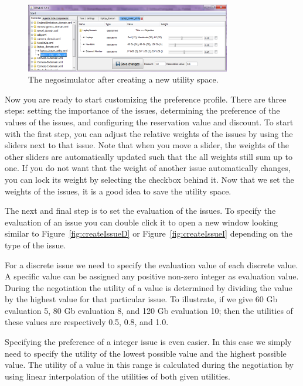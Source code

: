 \documentclass[]{article}
\begin{document}
\begin{figure}[htb]
	\centering
	\includegraphics[width=0.8\textwidth]{media/image8.png}
\caption{The negosimulator after creating a new utility space.}\label{fig:utilcreated}
\end{figure}

Now you are ready to start customizing the preference profile. There are three steps: setting the importance of the issues, determining the preference of the values of the issues, and configuring the reservation value and discount. To start with the first step, you can adjust the relative weights of the issues by using the sliders next to that issue. Note that when you move a slider, the weights of the other sliders are automatically updated such that the all weights still sum up to one. If you do not want that the weight of another issue automatically changes, you can lock its weight by selecting the checkbox behind it. Now that we set the weights of the issues, it is a good idea to save the utility space.

The next and final step is to set the evaluation of the issues. To specify the evaluation of an issue you can double click it to open a new window looking similar to Figure~\ref{fig:createIssueD} or Figure~\ref{fig:createIssueI} depending on the type of the issue.

For a discrete issue we need to specify the evaluation value of each discrete value. A specific value can be assigned any positive non-zero integer as evaluation value. During the negotiation the utility of a value is determined by dividing the value by the highest value for that particular issue. To illustrate, if we give 60 Gb evaluation 5, 80 Gb evaluation 8, and 120 Gb evaluation 10; then the utilities of these values are respectively 0.5, 0.8, and 1.0.

Specifying the preference of a integer issue is even easier. In this case we simply need to specify the utility of the lowest possible value and the highest possible value. The utility of a value in this range is calculated during the negotiation by using linear interpolation of the utilities of both given utilities.
\end{document}
